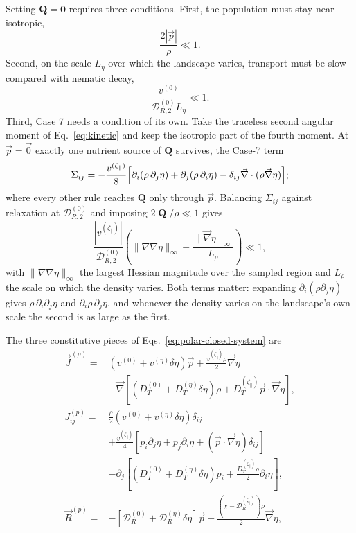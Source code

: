 \documentclass[
  reprint,
  superscriptaddress,
  amsmath,
  amssymb,
  aps,
  pre,
  nofootinbib,
  floatfix
]{revtex4-2}
\newcommand{\pv}{\vec p}
\newcommand{\Qt}{\mathbf Q}
\newcommand{\grad}{\vec{\nabla}}
\newcommand{\DR}{\mathcal D_R^{(0)}}
\newcommand{\DRtwo}{\mathcal D_{R,2}^{(0)}}
\newcommand{\zp}{\zeta_\parallel}
\begin{document}
Setting $\Qt=\mathbf0$ requires three conditions.  First, the population must
stay near-isotropic,
\begin{equation}
  \frac{2|\pv|}{\rho} \ll 1.
  \label{eq:near-isotropy-condition}
\end{equation}
Second, on the scale $L_\eta$ over which the landscape varies, transport must
be slow compared with nematic decay,
\begin{equation}
  \frac{v^{(0)}}{\DRtwo L_\eta} \ll 1.
  \label{eq:polar-closure-validity}
\end{equation}
Third, Case 7 needs a condition of its own.  Take the traceless second
angular moment of Eq.~\eqref{eq:kinetic} and keep the isotropic part of the
fourth moment.  At $\pv=\vec0$ exactly one nutrient source of $\mathbf Q$
survives, the Case-7 term
\begin{equation}
 \Sigma_{ij} = -\frac{v^{(\zp)}}{8}\Bigl[\partial_i(\rho\,\partial_j\eta)
 +\partial_j(\rho\,\partial_i\eta)
 -\delta_{ij}\grad\cdot(\rho\grad\eta)\Bigr];
 \label{eq:case7-nematic-source}
\end{equation}
where every other rule reaches $\mathbf Q$ only through $\pv$.  Balancing
$\Sigma_{ij}$ against relaxation at $\DRtwo$ and imposing $2|\mathbf Q|/\rho\ll1$
gives
\begin{equation}
  \frac{|v^{(\zp)}|}{\DRtwo}
  \left(\|\nabla\nabla\eta\|_\infty+\frac{\|\grad\eta\|_\infty}{L_\rho}\right)
  \ll 1,
  \label{eq:case7-nematic-validity}
\end{equation}
with $\|\nabla\nabla\eta\|_\infty$ the largest Hessian magnitude over the
sampled region and $L_\rho$ the scale on which the density varies.  Both terms
matter: expanding $\partial_i(\rho\partial_j\eta)$ gives
$\rho\,\partial_i\partial_j\eta$ and $\partial_i\rho\,\partial_j\eta$, and
whenever the density varies on the landscape's own scale the second is as
large as the first.

The three constitutive pieces of Eqs.~\eqref{eq:polar-closed-system} are
\begin{align}
 \vec J^{(\rho)} ={}& (v^{(0)}+v^{(\eta)}\delta\eta)\pv
 + \frac{v^{(\zp)}\rho}{2}\grad\eta
 \nonumber\\
 & - \grad\left[(D_T^{(0)}+D_T^{(\eta)}\delta\eta)\rho
 + D_T^{(\zp)}\pv\cdot\grad\eta\right],
 \label{eq:polar-closed-density-flux}\\
 J_{ij}^{(p)} ={}& \frac{\rho}{2}(v^{(0)}+v^{(\eta)}\delta\eta)\delta_{ij}
 \nonumber\\
 & + \frac{v^{(\zp)}}{4}\left[
 p_i\partial_j\eta + p_j\partial_i\eta + (\pv\cdot\grad\eta)\delta_{ij}\right]
 \nonumber\\
 & - \partial_j\left[(D_T^{(0)}+D_T^{(\eta)}\delta\eta)p_i
 + \frac{D_T^{(\zp)}\rho}{2}\partial_i\eta\right],
 \label{eq:polar-closed-polarity-flux}\\
 \vec R^{(p)} ={}& -\left[\DR+\mathcal D_R^{(\eta)}\delta\eta\right]\pv
 + \frac{(\chi - \mathcal D_R^{(\zp)})\rho}{2}\grad\eta,
 \label{eq:polar-closed-angular-source}
\end{align}
\end{document}
